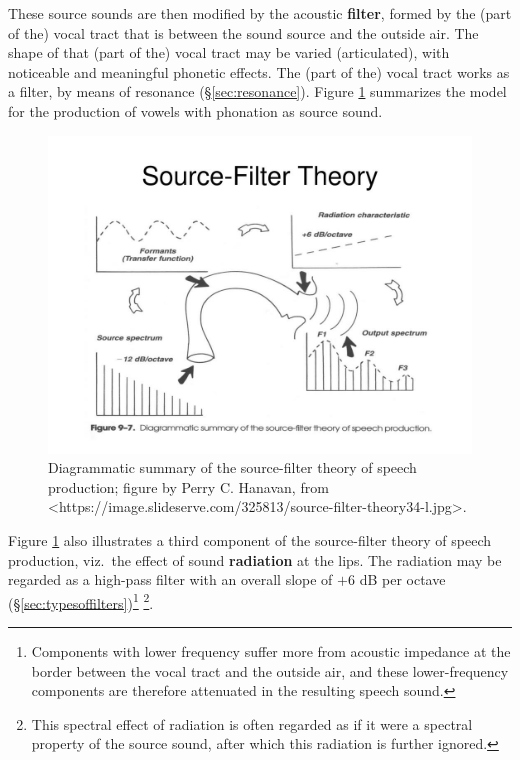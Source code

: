 \documentclass[
]{book}
\begin{document}
These source sounds are then modified by the acoustic \textbf{filter}, formed by the (part of the) vocal tract that is between the sound source and the outside air. The shape of that (part of the) vocal tract may be varied (articulated), with noticeable and meaningful phonetic effects. The (part of the) vocal tract works as a filter, by means of resonance (§\ref{sec:resonance}). Figure \ref{fig:source-filter} summarizes the model for the production of vowels with phonation as source sound.

\begin{figure}

{\centering \includegraphics{figures/source-filter-theory34-l} 

}

\caption{Diagrammatic summary of the source-filter theory of speech production; figure by Perry C. Hanavan, from <https://image.slideserve.com/325813/source-filter-theory34-l.jpg>.}\label{fig:source-filter}
\end{figure}

Figure \ref{fig:source-filter} also illustrates a third component of the source-filter theory of speech production, viz.~the effect of sound \textbf{radiation} at the lips. The radiation may be regarded as a high-pass filter with an overall slope of \(+6\) dB per octave (§\ref{sec:typesoffilters})\footnote{Components with lower frequency suffer more from acoustic impedance at the border between the vocal tract and the outside air, and these lower-frequency components are therefore attenuated in the resulting speech sound.} \footnote{This spectral effect of radiation is often regarded as if it were a spectral property of the source sound, after which this radiation is further ignored.}.
\end{document}
